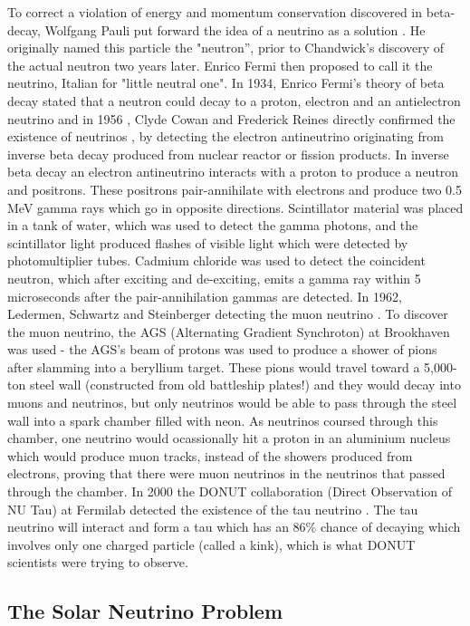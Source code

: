 To correct a violation of energy and momentum conservation discovered in beta-decay, Wolfgang Pauli put forward the idea of a neutrino as a solution \cite{brown_idea_1978}.  He originally named this particle the "neutron'', prior to Chandwick's discovery of the actual neutron two years later.  Enrico Fermi then proposed to call it the neutrino, Italian for "little neutral one". In 1934, Enrico Fermi's theory of beta decay stated that a neutron could decay to a proton, electron and an antielectron neutrino and in 1956 \cite{luca_electroweak}, Clyde Cowan and Frederick Reines directly confirmed the existence of neutrinos \cite{cowan_reines}, by detecting the electron antineutrino originating from inverse beta decay produced from nuclear reactor or fission products. In inverse beta decay an electron antineutrino interacts with a proton to produce a neutron and positrons. These positrons pair-annihilate with electrons and produce two 0.5 MeV gamma rays which go in opposite directions. Scintillator material was placed in a tank of water, which was used to detect the gamma photons, and the scintillator light produced flashes of visible light which were detected by photomultiplier tubes. Cadmium chloride was used to detect the coincident neutron, which after exciting and de-exciting, emits a gamma ray within 5 microseconds after the pair-annihilation gammas are detected. In 1962, Ledermen, Schwartz and Steinberger detecting the muon neutrino \cite{muon_neutrino}. To discover the muon neutrino, the AGS (Alternating Gradient Synchroton) at Brookhaven was used - the AGS's beam of protons was used to produce a shower of pions after slamming into a beryllium target. These pions would travel toward a 5,000-ton steel wall (constructed from old battleship plates!) and they would decay into muons and neutrinos, but only neutrinos would be able to pass through the steel wall into a spark chamber filled with neon. As neutrinos coursed through this chamber, one neutrino would ocassionally hit a proton in an aluminium nucleus which would produce muon tracks, instead of the showers produced from electrons, proving that there were muon neutrinos in the neutrinos that passed through the chamber. In 2000 the DONUT collaboration (Direct Observation of NU Tau) at Fermilab detected the existence of the tau neutrino \cite{lederman_schwartz}. The tau neutrino will interact and form a tau which has an 86\% chance of decaying which involves only one charged particle (called a kink), which is what DONUT scientists were trying to observe.

\subsection{The Solar Neutrino Problem}

